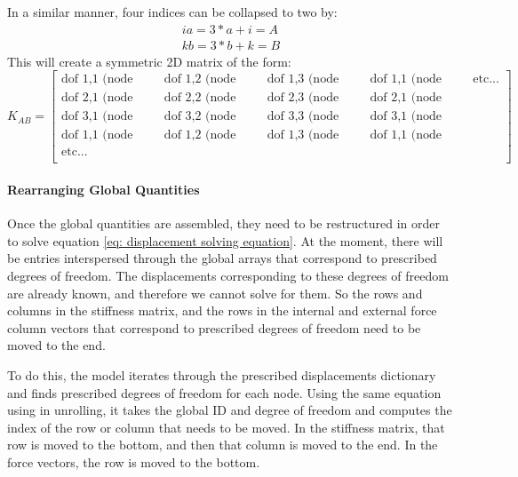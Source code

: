 \documentclass[]{spie}  %
\begin{document}
In a similar manner, four indices can be collapsed to two by:
\begin{gather}
\label{eq: unrolling 2}
ia = 3 * a + i = A \\
kb = 3 * b + k = B
\end{gather}
This will create a symmetric 2D matrix of the form:
\begin{equation}
\label{eq: global stiffness matrix}
K_{AB} =
\begin{bmatrix}
\textrm{dof 1,1 (node 1,1)}	 & \textrm{dof 1,2 (node 1,1)} & \textrm{dof 1,3 (node 1,1)}& \textrm{dof 1,1 (node 1,2)}&\textrm{etc...}\\
\textrm{dof 2,1 (node 1,1)}	 & \textrm{dof 2,2 (node 1,1)} & \textrm{dof 2,3 (node 1,1)}& \textrm{dof 2,1 (node 1,2)}\\
\textrm{dof 3,1 (node 1,1)}	 & \textrm{dof 3,2 (node 1,1)} & \textrm{dof 3,3 (node 1,1)}& \textrm{dof 3,1 (node 1,2)}\\
\textrm{dof 1,1 (node 2,1)}	 & \textrm{dof 1,2 (node 2,1)} & \textrm{dof 1,3 (node 2,1)}& \textrm{dof 1,1 (node 2,2)}\\
\textrm{etc...}	&&&&\\
\end{bmatrix}
\end{equation}

\paragraph{Rearranging Global Quantities}
Once the global quantities are assembled, they need to be restructured in order to solve equation \ref{eq: displacement solving equation}. At the moment, there will be entries interspersed through the global arrays that correspond to prescribed degrees of freedom. The displacements corresponding to these degrees of freedom are already known, and therefore we cannot solve for them. So the rows and columns in the stiffness matrix, and the rows in the internal and external force column vectors that correspond to prescribed degrees of freedom need to be moved to the end. 

To do this, the model iterates through the prescribed displacements dictionary and finds prescribed degrees of freedom for each node. Using the same equation using in unrolling, it takes the global ID and degree of freedom and computes the index of the row or column that needs to be moved. In the stiffness matrix, that row is moved to the bottom, and then that column is moved to the end. In the force vectors, the row is moved to the bottom. 
\end{document}

